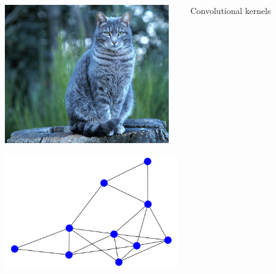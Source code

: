 \documentclass[landscape,a0paper]{tikzposter}
\begin{document}
\begin{columns}
{{\begin{center}
\begin{minipage}{0.4\linewidth}
\begin{center}
          \includegraphics[height=6cm]{figures/cat.jpg}

          \vspace{0.5cm}
        
          \end{center}
      \end{minipage} 
      \begin{minipage}{0.1\linewidth}
      \begin{center}
      
		        
         \end{center}
      \end{minipage} \hspace{0cm}
	\begin{minipage}{0.4\linewidth}
	\begin{center}
          \includegraphics[height=5cm]{figures/graph.png}
          
        
          \end{center}
      \end{minipage} 
    
    \end{center}
\vspace{1cm}
\begin{center}
\begin{minipage}{0.4\linewidth}
\vspace{-1.5cm}
		\begin{center}
		Convolutional kernels	 	 
	\end{center}		       
      

\end{minipage}
\end{center}}}
\end{columns}
\end{document}
